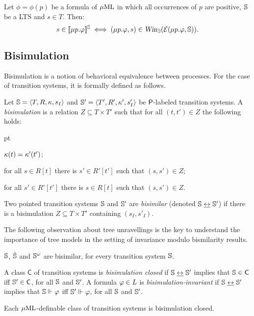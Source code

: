 \begin{proposition}\label{p:unfold=evalgame}
Let $\phi = \phi(p)$ be a formula of $\mu\mathrm{ML}$ in which all occurrences of $p$ are positive, $\mathbb{S}$ be a LTS and $s \in T$. Then:
\begin{equation}
\label{eq:adeq3}
s \in \ext{\mu p.\phi}^{\bbS} %
\iff (\mu p.\phi,s) \in \win_{\eloise}(\egame(\mu p.\phi,\bbS)).
\end{equation}
\end{proposition}


\subsection{Bisimulation}
% 

Bisimulation is a notion of behavioral equivalence between processes.
For the case of  transition systems, it is formally defined as follows.

\begin{definition}
Let $\mathbb{S} = \langle{T, R, \kappa, s_I}\rangle$ and $\mathbb{S}' = \langle{T', R', \kappa', 
s'_I}\rangle$ be $\mathsf{P}$-labeled transition systems.
A \emph{bisimulation} is a relation $Z \subseteq T \times T'$ such that for all 
$(t,t') \in Z$ the following holds:
\begin{description}
   pt
  \item[(atom)] 
  $\kappa(t) = \kappa'(t')$;
  \item[(forth)] 
  for all $s \in R[t]$ there is $s'\in R'[t']$ such
  that $(s,s') \in Z$;
  \item[(back)] 
  for all $s'\in R'[t']$ there is $s \in R[t]$ such
  that $(s,s') \in Z$.
\end{description}
%
Two pointed transition systems $\mathbb{S}$ and $\mathbb{S}'$ are
\emph{bisimilar} (denoted $\mathbb{S} \mathrel{\underline{\leftrightarrow}} \mathbb{S}'$) if there is a
bisimulation $Z \subseteq T \times T'$ containing $(s_I,s'_I)$.
\end{definition}

The following observation about tree unravellings is the key to understand
the importance of tree models in the setting of invariance modulo bismilarity
results.

\begin{fact}
    \label{prop:tree_unrav}
$\mathbb{S}$, $\hat{\mathbb{S}}$ and $\mathbb{S}^{\omega}$ are bisimilar, for every transition
system $\mathbb{S}$.
\end{fact}

A class $\mathsf{C}$ of transition systems is \emph{bisimulation closed} if 
$\mathbb{S} \mathrel{\underline{\leftrightarrow}} \mathbb{S}'$ implies that $\mathbb{S} \in \mathsf{C}$ iff $\mathbb{S}'
\in \mathsf{C}$, for all $\mathbb{S}$ and $\mathbb{S}'$.
A formula $\varphi \in L$ is \emph{bisimulation-invariant} if $\mathbb{S} \mathrel{\underline{\leftrightarrow}}
\mathbb{S}'$ implies that $\mathbb{S} \Vdash \varphi$ iff $\mathbb{S}'
\Vdash \varphi$, for all $\mathbb{S}$ and $\mathbb{S}'$.

\begin{fact}
Each $\mu\mathrm{ML}$-definable class of transition systems is bisimulation closed.
\end{fact}


